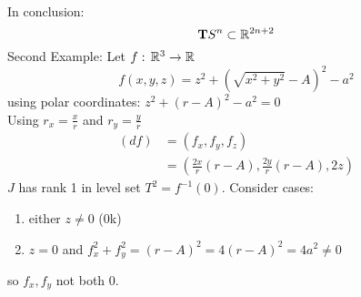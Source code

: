 \begin{examples}
\begin{gather*}
\end{gather*}
In conclusion:
$$\text{\textbf{T}} S^n \subset \mathbb{R}^{2n+2}$$ 
Second Example: Let $f:\, \mathbb{R}^3\to \mathbb{R}$
$$f(x,y,z)= z^2 + (\sqrt{x^2+y^2}-A)^2 -a^2$$
using polar coordinates: $z^2 + (r-A)^2 - a^2=0$\\
Using $r_x= \frac{x}{r}$ and $r_y= \frac{y}{r}$ 
\begin{align*}
(df)&=(f_x,f_y,f_z)\\
&=\left( \frac{2x}{r}(r-A), \frac{2y}{r}(r-A), 2z \right)
\end{align*}
$J$ has rank 1 in level set $T^2=f ^{-1} (0)$. Consider cases:
\begin{enumerate}
\item either $z\neq 0$ (0k)
\item $z=0$ and $f_x^2 + f_y^2 = (r-A)^2=4(r-A)^2=4a^2 \neq 0$ 
\end{enumerate}
    so $f_x,f_y$ not both 0.
\end{examples}
